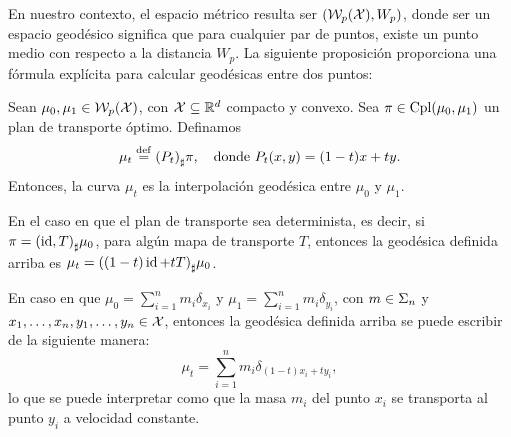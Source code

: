 {{{			En nuestro contexto, el espacio métrico resulta ser $(\WassersteinSpace[p]{\cX} , W_p)$, donde ser un espacio geodésico  significa que para cualquier par de puntos, existe un punto medio con respecto a la distancia $W_p$. La siguiente proposición proporciona una fórmula explícita para calcular geodésicas entre dos puntos:

			\begin{proposition}
				Sean $\mu_0, \mu_1 \in \WassersteinSpace[p]{\cX} $, con $\cX \subseteq \R^d$  compacto y convexo. Sea $\pi \in \Cpl(\mu_0, \mu_1)$  un plan de transporte óptimo. Definamos
				\begin{equation}
					\mu_t \eqdef \pf{(P_t)} \pi, \quad \text{donde } P_t(x, y) = (1-t)x + ty.
				\end{equation}
				Entonces, la curva $\mu_t$ es la interpolación geodésica entre $\mu_0$ y $\mu_1$.

			\end{proposition}

			\begin{example}
				En el caso en que el plan de transporte sea determinista, es decir, si $\pi = \pf{(\id, T)} \mu_0$, para algún mapa de transporte $T$, entonces la geodésica definida arriba es $\mu_t = \pf{((1-t)\id + tT)} \mu_0$.
			\end{example}

			\begin{remark}
				En caso en que $\mu_0 = \sum_{i=1}^{n} m_i \delta_{x_i}$ y $\mu_1 = \sum_{i=1}^{n} m_i \delta_{y_i}$, con $m\in\Simplex[n]$ y $x_1,\ldots, x_n, y_1,\ldots, y_n \in \cX$, entonces la geodésica definida arriba se puede escribir de la siguiente manera:
				\begin{equation}
					\mu_t = \sum_{i=1}^{n} m_i \delta_{(1-t)x_i + ty_i},
				\end{equation}
				lo que se puede interpretar como que la masa $m_i$ del punto $x_i$ se transporta al punto $y_i$ a velocidad constante.
			\end{remark}




		}  %

}}
